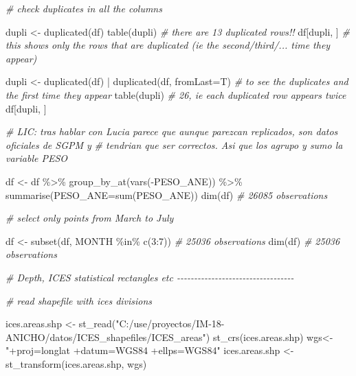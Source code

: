 \documentclass[
]{book}
\newenvironment{Shaded}{\begin{snugshade}}{\end{snugshade}}
\newcommand{\AttributeTok}[1]{\textcolor[rgb]{0.77,0.63,0.00}{#1}}
\newcommand{\CommentTok}[1]{\textcolor[rgb]{0.56,0.35,0.01}{\textit{#1}}}
\newcommand{\DecValTok}[1]{\textcolor[rgb]{0.00,0.00,0.81}{#1}}
\newcommand{\FunctionTok}[1]{\textcolor[rgb]{0.00,0.00,0.00}{#1}}
\newcommand{\NormalTok}[1]{#1}
\newcommand{\OtherTok}[1]{\textcolor[rgb]{0.56,0.35,0.01}{#1}}
\newcommand{\SpecialCharTok}[1]{\textcolor[rgb]{0.00,0.00,0.00}{#1}}
\newcommand{\StringTok}[1]{\textcolor[rgb]{0.31,0.60,0.02}{#1}}
\begin{document}
\begin{Shaded}
\begin{Highlighting}[]
\CommentTok{\# check duplicates in all the columns}

\NormalTok{dupli }\OtherTok{\textless{}{-}} \FunctionTok{duplicated}\NormalTok{(df)}
\FunctionTok{table}\NormalTok{(dupli) }\CommentTok{\# there are 13 duplicated rows!!}
\NormalTok{df[dupli, ] }\CommentTok{\# this shows only the rows that are duplicated (ie the second/third/... time they appear)}

\NormalTok{dupli }\OtherTok{\textless{}{-}} \FunctionTok{duplicated}\NormalTok{(df) }\SpecialCharTok{|} \FunctionTok{duplicated}\NormalTok{(df, }\AttributeTok{fromLast=}\NormalTok{T) }\CommentTok{\# to see the duplicates and the first time they appear}
\FunctionTok{table}\NormalTok{(dupli) }\CommentTok{\# 26, ie each duplicated row appears twice }
\NormalTok{df[dupli, ]}

\CommentTok{\# LIC: tras hablar con Lucia parece que aunque parezcan replicados, son datos oficiales de SGPM y}
\CommentTok{\# tendrian que ser correctos. Asi que los agrupo y sumo la variable PESO}

\NormalTok{df }\OtherTok{\textless{}{-}}\NormalTok{ df }\SpecialCharTok{\%\textgreater{}\%} 
  \FunctionTok{group\_by\_at}\NormalTok{(}\FunctionTok{vars}\NormalTok{(}\SpecialCharTok{{-}}\NormalTok{PESO\_ANE)) }\SpecialCharTok{\%\textgreater{}\%} 
  \FunctionTok{summarise}\NormalTok{(}\AttributeTok{PESO\_ANE=}\FunctionTok{sum}\NormalTok{(PESO\_ANE)) }
\FunctionTok{dim}\NormalTok{(df) }\CommentTok{\# 26085 observations}

\CommentTok{\# select only points from March to July}

\NormalTok{df }\OtherTok{\textless{}{-}} \FunctionTok{subset}\NormalTok{(df, MONTH }\SpecialCharTok{\%in\%} \FunctionTok{c}\NormalTok{(}\DecValTok{3}\SpecialCharTok{:}\DecValTok{7}\NormalTok{)) }\CommentTok{\# 25036 observations}
\FunctionTok{dim}\NormalTok{(df) }\CommentTok{\# 25036 observations}

\CommentTok{\# Depth, ICES statistical rectangles etc {-}{-}{-}{-}{-}{-}{-}{-}{-}{-}{-}{-}{-}{-}{-}{-}{-}{-}{-}{-}{-}{-}{-}{-}{-}{-}{-}{-}{-}{-}{-}{-}{-}{-}}


\CommentTok{\# read shapefile with ices divisions}

\NormalTok{ices.areas.shp }\OtherTok{\textless{}{-}} \FunctionTok{st\_read}\NormalTok{(}\StringTok{"C:/use/proyectos/IM{-}18{-}ANICHO/datos/ICES\_shapefiles/ICES\_areas"}\NormalTok{)}
\FunctionTok{st\_crs}\NormalTok{(ices.areas.shp)}
\NormalTok{wgs}\OtherTok{\textless{}{-}}\StringTok{"+proj=longlat +datum=WGS84 +ellps=WGS84"}
\NormalTok{ices.areas.shp }\OtherTok{\textless{}{-}} \FunctionTok{st\_transform}\NormalTok{(ices.areas.shp, wgs) }


\end{Highlighting}
\end{Shaded}
\end{document}
